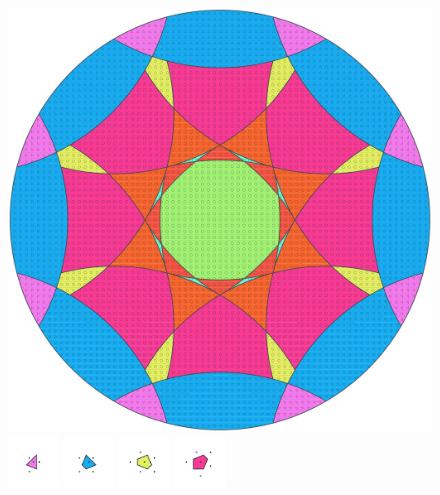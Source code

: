 \documentclass[text.tex]{subfiles}
\begin{document}
\clearpage
\pagestyle{fancy}
\fancyhf{}
\begin{figure}[h!]
\centering
\includegraphics[width=1\textwidth]{img/results/circle8/circle8_139906_(-508_211alpha_1).pdf}
\includegraphics[width=0.12\textwidth]{img/results/circle8/circle8_139906_(-508_211alpha_1)_001.pdf}
\includegraphics[width=0.12\textwidth]{img/results/circle8/circle8_139906_(-508_211alpha_1)_002.pdf}
\includegraphics[width=0.12\textwidth]{img/results/circle8/circle8_139906_(-508_211alpha_1)_003.pdf}
\includegraphics[width=0.12\textwidth]{img/results/circle8/circle8_139906_(-508_211alpha_1)_004.pdf}

\end{figure}
\end{document}
